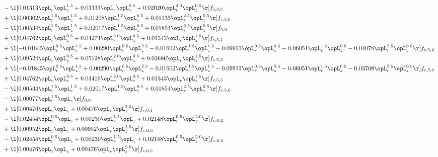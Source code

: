 \begin{alignat}{2}
& - \l[  0.01313 \opL_r \opL_z^{1.5} +  0.03333 \opL_r \opL_z^{0.5} +  0.02020 \opL_r^{2.0} \opL_z^{0.5}  \r] f_{c,3,5} \nonumber \\ 
& + \l[  0.00302 \opL_r^{1.5} \opL_z^{1.5} +  0.01208 \opL_r^{1.5} \opL_z^{0.5} +  0.01133 \opL_r^{2.5} \opL_z^{0.5}  \r] f_{c,3,6} \nonumber \\ 
& - \l[  0.00534 \opL_r^{1.5} \opL_z^{1.5} +  0.02017 \opL_r^{1.5} \opL_z^{0.5} +  0.01854 \opL_r^{2.5} \opL_z^{0.5}  \r] f_{5,0} \nonumber \\ 
& + \l[  0.04762 \opL_r \opL_z^{0.5} +  0.04274 \opL_r^{2.0} \opL_z^{0.5} +  0.01343 \opL_r \opL_z^{1.5}  \r] f_{c,5,1} \nonumber \\ 
& + \l[  -0.01845 \opL_r^{0.5} \opL_z^{1.5} +  0.00290 \opL_r^{0.5} \opL_z^{2.5}   -0.01602 \opL_r^{1.5} \opL_z^{1.5}   -0.09913 \opL_r^{0.5} \opL_z^{0.5}   -0.06051 \opL_r^{1.5} \opL_z^{0.5}   -0.04078 \opL_r^{2.5} \opL_z^{0.5}  \r] f_{c,5,2} \nonumber \\ 
& + \l[  0.09524 \opL_r \opL_z^{0.5} +  0.05128 \opL_r^{2.0} \opL_z^{0.5} +  0.02686 \opL_r \opL_z^{1.5}  \r] f_{c,5,3} \nonumber \\ 
& + \l[  -0.01845 \opL_r^{0.5} \opL_z^{1.5} +  0.00290 \opL_r^{0.5} \opL_z^{2.5}   -0.01602 \opL_r^{1.5} \opL_z^{1.5}   -0.09913 \opL_r^{0.5} \opL_z^{0.5}   -0.06051 \opL_r^{1.5} \opL_z^{0.5}   -0.03708 \opL_r^{2.5} \opL_z^{0.5}  \r] f_{c,5,4} \nonumber \\ 
& + \l[  0.04762 \opL_r \opL_z^{0.5} +  0.03419 \opL_r^{2.0} \opL_z^{0.5} +  0.01343 \opL_r \opL_z^{1.5}  \r] f_{c,5,5} \nonumber \\ 
& - \l[  0.00534 \opL_r^{1.5} \opL_z^{1.5} +  0.02017 \opL_r^{1.5} \opL_z^{0.5} +  0.01854 \opL_r^{2.5} \opL_z^{0.5}  \r] f_{c,5,6} \nonumber \\ 
& - \l[  0.00077 \opL_r^{1.5} \opL_z  \r] f_{0,0} \nonumber \\ 
& + \l[  0.00476 \opL_r \opL_z +  0.00476 \opL_r \opL_z^{2.0}  \r] f_{c,0,1} \nonumber \\ 
& - \l[  0.02454 \opL_r^{0.5} \opL_z +  0.00230 \opL_r^{1.5} \opL_z +  0.02148 \opL_r^{0.5} \opL_z^{2.0}  \r] f_{c,0,2} \nonumber \\ 
& + \l[  0.00952 \opL_r \opL_z +  0.00952 \opL_r \opL_z^{2.0}  \r] f_{c,0,3} \nonumber \\ 
& - \l[  0.02454 \opL_r^{0.5} \opL_z +  0.00230 \opL_r^{1.5} \opL_z +  0.02148 \opL_r^{0.5} \opL_z^{2.0}  \r] f_{c,0,4} \nonumber \\ 
& + \l[  0.00476 \opL_r \opL_z +  0.00476 \opL_r \opL_z^{2.0}  \r] f_{c,0,5} \nonumber \\ 

\end{alignat}

